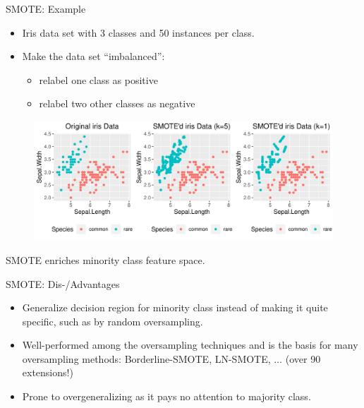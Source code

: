 \documentclass[11pt,compress,t,notes=noshow, xcolor=table]{beamer}
\begin{document}
\begin{frame}{SMOTE: Example}
    
    \begin{itemize}
        \item Iris data set with 3 classes %
        and 50 instances per class.
        
        \item Make the data set ``imbalanced'': 
        \begin{itemize}
            \item relabel one class as positive
            \item relabel two other classes as negative
        \end{itemize}
    \end{itemize}		

    \begin{figure}
        \centering
        \includegraphics[width=0.9\linewidth]{figure_man/smoted_iris_data_ggplot.pdf}
    \end{figure}

SMOTE enriches minority class feature space.
	
\end{frame}


\begin{frame}{SMOTE: Dis-/Advantages}

    \begin{itemize}
    
        \item Generalize decision region for minority class instead of making it quite specific, such as by random oversampling. 
        
        \item Well-performed among the oversampling techniques and is the basis for many oversampling methods: Borderline-SMOTE, LN-SMOTE, $\ldots$ (over 90 extensions!)
    
        \item Prone to overgeneralizing as it pays no attention to majority class.

    \end{itemize}		

\end{frame}
\end{document}
